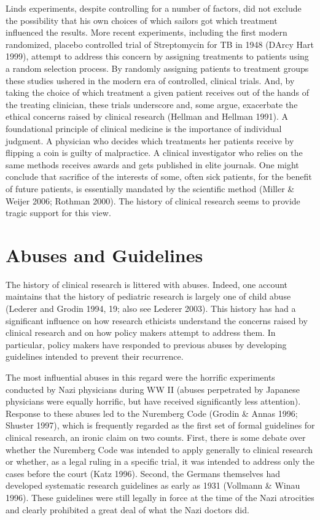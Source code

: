 \documentclass[12p]{article}
\begin{document}
Linds experiments, despite controlling for a number of factors, did not exclude the possibility that his own choices of which sailors got which treatment influenced the results. More recent experiments, including the first modern randomized, placebo controlled trial of Streptomycin for TB in 1948 (DArcy Hart 1999), attempt to address this concern by assigning treatments to patients using a random selection process. By randomly assigning patients to treatment groups these studies ushered in the modern era of controlled, clinical trials. And, by taking the choice of which treatment a given patient receives out of the hands of the treating clinician, these trials underscore and, some argue, exacerbate the ethical concerns raised by clinical research (Hellman and Hellman 1991). A foundational principle of clinical medicine is the importance of individual judgment. A physician who decides which treatments her patients receive by flipping a coin is guilty of malpractice. A clinical investigator who relies on the same methods receives awards and gets published in elite journals. One might conclude that sacrifice of the interests of some, often sick patients, for the benefit of future patients, is essentially mandated by the scientific method (Miller & Weijer 2006; Rothman 2000). The history of clinical research seems to provide tragic support for this view.

\section{Abuses and Guidelines}

 The history of clinical research is littered with abuses. Indeed, one account maintains that the history of pediatric research is largely one of child abuse (Lederer and Grodin 1994, 19; also see Lederer 2003). This history has had a significant influence on how research ethicists understand the concerns raised by clinical research and on how policy makers attempt to address them. In particular, policy makers have responded to previous abuses by developing guidelines intended to prevent their recurrence.

The most influential abuses in this regard were the horrific experiments conducted by Nazi physicians during WW II (abuses perpetrated by Japanese physicians were equally horrific, but have received significantly less attention). Response to these abuses led to the Nuremberg Code (Grodin & Annas 1996; Shuster 1997), which is frequently regarded as the first set of formal guidelines for clinical research, an ironic claim on two counts. First, there is some debate over whether the Nuremberg Code was intended to apply generally to clinical research or whether, as a legal ruling in a specific trial, it was intended to address only the cases before the court (Katz 1996). Second, the Germans themselves had developed systematic research guidelines as early as 1931 (Vollmann & Winau 1996). These guidelines were still legally in force at the time of the Nazi atrocities and clearly prohibited a great deal of what the Nazi doctors did.
\end{document}
